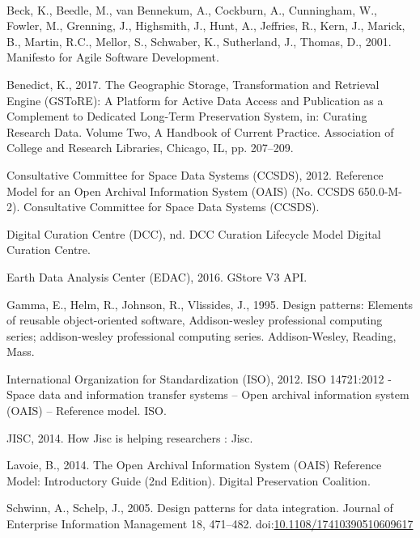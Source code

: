 \documentclass[final]{beamer}
\begin{document}
\begin{frame}[t]
\begin{multicols}{2}
~

\hypertarget{refs}{}
\hypertarget{ref-beckux5fmanifestoux5f2001}{}
Beck, K., Beedle, M., van Bennekum, A., Cockburn, A., Cunningham, W.,
Fowler, M., Grenning, J., Highsmith, J., Hunt, A., Jeffries, R., Kern,
J., Marick, B., Martin, R.C., Mellor, S., Schwaber, K., Sutherland, J.,
Thomas, D., 2001. Manifesto for Agile Software Development.

\hypertarget{ref-benedictux5fgeographicux5f2017}{}
Benedict, K., 2017. The Geographic Storage, Transformation and Retrieval
Engine (GSToRE): A Platform for Active Data Access and Publication as a
Complement to Dedicated Long-Term Preservation System, in: Curating
Research Data. Volume Two, A Handbook of Current Practice. Association
of College and Research Libraries, Chicago, IL, pp. 207--209.

\hypertarget{ref-bookux5freferenceux5f2012}{}
Consultative Committee for Space Data Systems (CCSDS), 2012. Reference
Model for an Open Archival Information System (OAIS) (No. CCSDS
650.0-M-2). Consultative Committee for Space Data Systems (CCSDS).

\hypertarget{ref-digitalux5fcurationux5fcentreux5fdccux5fdccux5fnd}{}
Digital Curation Centre (DCC), nd. DCC Curation Lifecycle Model
\textbar{} Digital Curation Centre.

\hypertarget{ref-ux5fgstoreux5f2016}{}
Earth Data Analysis Center (EDAC), 2016. GStore V3 API.

\hypertarget{ref-gammaux5fdesignux5f1995}{}
Gamma, E., Helm, R., Johnson, R., Vlissides, J., 1995. Design patterns:
Elements of reusable object-oriented software, Addison-wesley
professional computing series; addison-wesley professional computing
series. Addison-Wesley, Reading, Mass.

\hypertarget{ref-ux5fisoux5f2012}{}
International Organization for Standardization (ISO), 2012. ISO
14721:2012 - Space data and information transfer systems -- Open
archival information system (OAIS) -- Reference model. ISO.

\hypertarget{ref-ux5fhowux5f2014}{}
JISC, 2014. How Jisc is helping researchers : Jisc.

\hypertarget{ref-oclcux5fopenux5f2014}{}
Lavoie, B., 2014. The Open Archival Information System (OAIS) Reference
Model: Introductory Guide (2nd Edition). Digital Preservation Coalition.

\hypertarget{ref-schwinnux5fdesignux5f2005}{}
Schwinn, A., Schelp, J., 2005. Design patterns for data integration.
Journal of Enterprise Information Management 18, 471--482.
doi:\href{https://doi.org/10.1108/17410390510609617}{10.1108/17410390510609617}


\end{multicols}
\end{frame}
\end{document}
